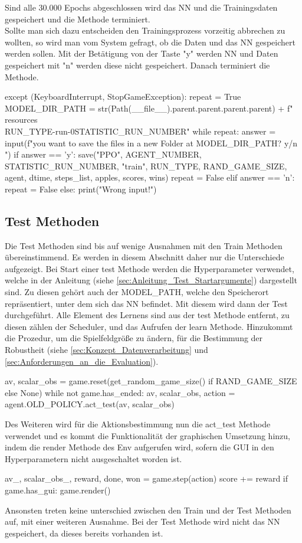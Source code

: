 Sind alle 30.000 Epochs abgeschlossen wird das NN und die Trainingsdaten gespeichert und die Methode terminiert.\\
Sollte man sich dazu entscheiden den Trainingsprozess vorzeitig abbrechen zu wollten, so wird man vom System gefragt, ob die Daten und das NN gespeichert werden sollen. Mit der Betätigung von der Taste "y" werden NN und Daten gespeichert mit "n" werden diese nicht gespeichert. Danach terminiert die Methode.
\begin{python}
	except (KeyboardInterrupt, StopGameException):
		repeat = True
		MODEL_DIR_PATH = str(Path(__file__).parent.parent.parent.parent) + 
		f"\\resources\\{RUN_TYPE}-run-0{STATISTIC_RUN_NUMBER}"
		while repeat:
			answer = input(f"\nDo you want to save the files
			 								in a new Folder at {MODEL_DIR_PATH}? y/n \n")
			if answer == 'y':
				save("PPO", AGENT_NUMBER, STATISTIC_RUN_NUMBER, "train",
						 RUN_TYPE, RAND_GAME_SIZE, agent, dtime, steps_list, 
						 apples, scores, wins)
				repeat = False
			elif answer == 'n':
				repeat = False
			else:
				print("Wrong input!")
\end{python}

\subsection{Test Methoden}
Die Test Methoden sind bis auf wenige Ausnahmen mit den Train Methoden übereinstimmend. Es werden in diesem Abschnitt daher nur die Unterschiede aufgezeigt. Bei Start einer test Methode werden die Hyperparameter verwendet, welche in der Anleitung (siehe \ref{sec:Anleitung_Test_Startargumente}) dargestellt sind. Zu diesen gehört auch der MODEL\_PATH, welche den Speicherort repräsentiert, unter dem sich das NN befindet. Mit diesem wird dann der Test durchgeführt. Alle Element des Lernens sind aus der test Methode entfernt, zu diesen zählen der Scheduler, und das Aufrufen der learn Methode. Hinzukommt die Prozedur, um die Spielfeldgröße zu ändern, für die Bestimmung der Robustheit (siehe \ref{sec:Konzept_Datenverarbeitung} und \ref{sec:Anforderungen_an_die_Evaluation}). 
\begin{python}
	av, scalar_obs = game.reset(get_random_game_size() 
									 if RAND_GAME_SIZE else None)
	while not game.has_ended:
		av, scalar_obs, action = agent.OLD_POLICY.act_test(av, scalar_obs)
\end{python}
Des Weiteren wird für die Aktionsbestimmung nun die act\_test Methode verwendet und es kommt die Funktionalität der graphischen Umsetzung hinzu, indem die render Methode des Env aufgerufen wird, sofern die GUI in den Hyperparametern nicht ausgeschaltet worden ist.
\begin{python}
	av_, scalar_obs_, reward, done, won = game.step(action)
	score += reward
	if game.has_gui:
		game.render()
\end{python}
Ansonsten treten keine unterschied zwischen den Train und der Test Methoden auf, mit einer weiteren Ausnahme. Bei der Test Methode wird nicht das NN gespeichert, da dieses bereits vorhanden ist.


